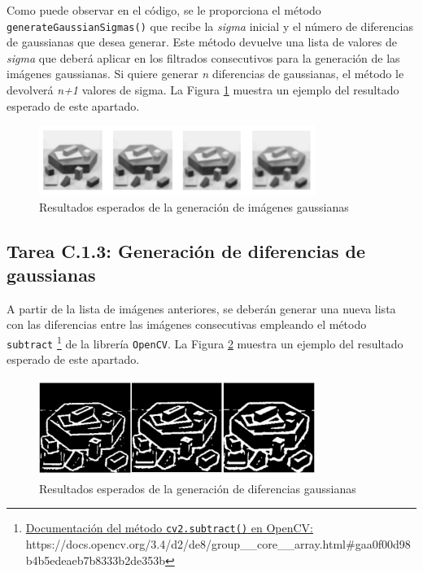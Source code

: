 Como puede observar en el código, se le proporciona el método \texttt{generateGaussianSigmas()} que recibe la \textit{sigma} inicial y el número de diferencias de gaussianas que desea generar. Este método devuelve una lista de valores de \textit{sigma} que deberá aplicar en los filtrados consecutivos para la generación de las imágenes gaussianas. Si quiere generar \textit{n} diferencias de gaussianas, el método le devolverá \textit{n+1} valores de sigma. La Figura \ref{fig:gauss_blur} muestra un ejemplo del resultado esperado de este apartado.

\begin{figure}[h]
    \centering
    \includegraphics[width=0.8\textwidth]{Lab_3/template/figures/GaussianBlur.png}
    \caption{Resultados esperados de la generación de imágenes gaussianas}
    \label{fig:gauss_blur}
\end{figure}

\subsection*{Tarea C.1.3: Generación de diferencias de gaussianas}

A partir de la lista de imágenes anteriores, se deberán generar una nueva lista con las diferencias entre las imágenes consecutivas empleando el método \texttt{subtract} \footnote{ \href{https://docs.opencv.org/3.4/d2/de8/group\_\_core\_\_array.html\#gaa0f00d98b4b5edeaeb7b8333b2de353b}{Documentación del método \texttt{cv2.subtract()} en OpenCV:} \\{https://docs.opencv.org/3.4/d2/de8/group\_\_core\_\_array.html\#gaa0f00d98b4b5edeaeb7b8333b2de353b}} de la librería \texttt{OpenCV}. La Figura \ref{fig:dog} muestra un ejemplo del resultado esperado de este apartado.



\begin{figure}[h]
    \centering
    \includegraphics[width=0.8\textwidth]{Lab_3/template/figures/DoG.png}
    \caption{Resultados esperados de la generación de diferencias gaussianas}
    \label{fig:dog}
\end{figure}


